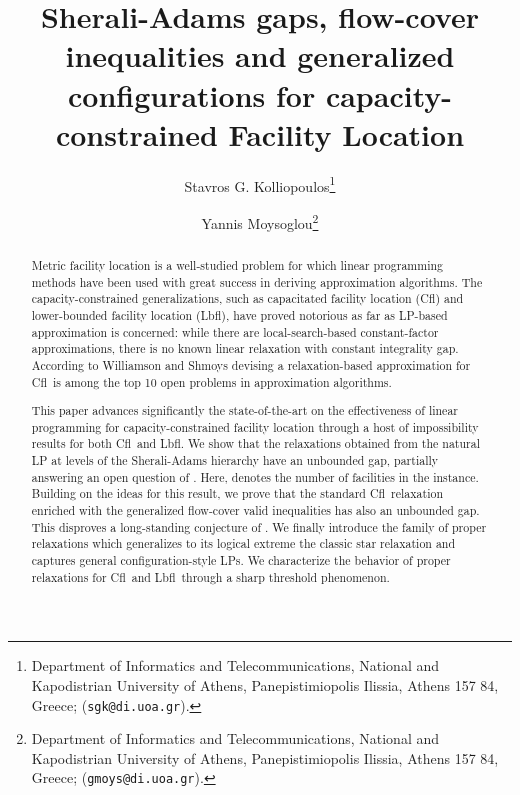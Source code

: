 \documentclass[11pt]{article}
\date{}
\newcommand{\lbfl}{{\sc Lbfl}}
\newcommand{\cfl}{{\sc Cfl}}
\begin{document}
\title{
Sherali-Adams gaps, flow-cover inequalities and generalized configurations for
 capacity-constrained Facility Location 
}

\author{Stavros G. Kolliopoulos\thanks{Department of Informatics and
Telecommunications, National and Kapodistrian 
University of Athens, Panepistimiopolis Ilissia, Athens
157 84, Greece; (\texttt{sgk@di.uoa.gr}).}   
\and Yannis Moysoglou\thanks{ 
Department of Informatics and
Telecommunications, National and Kapodistrian 
University of Athens, Panepistimiopolis Ilissia, Athens
157 84, Greece; (\texttt{gmoys@di.uoa.gr}). } }


\maketitle

\begin{abstract}
Metric facility  location is a  well-studied problem for  which linear
programming  methods have  been used  with great  success  in deriving
approximation  algorithms.  The capacity-constrained  generalizations,
such  as  capacitated  facility  location (\cfl\/)  and  lower-bounded
facility location  (\lbfl), have proved  notorious as far  as LP-based
approximation  is  concerned:   while  there  are  local-search-based
constant-factor  approximations, there  is no known  linear relaxation
with  constant  integrality gap.  According  to    Williamson and Shmoys 
devising a  relaxation-based approximation for \cfl\ is  among the top
10 open problems in approximation algorithms.

This paper  advances significantly the  state-of-the-art 
on  the effectiveness of
linear programming for capacity-constrained facility location
through  a host of impossibility 
results   
for  both \cfl\  and  \lbfl.   We show  that  the  relaxations
obtained   from  the  natural   LP  at     levels   of  the
Sherali-Adams  hierarchy  have an  unbounded  gap,  partially 
answering an  open
question of  \cite{LiS13, AnBS13}. Here,  denotes the  number of facilities
in the instance.  Building on the ideas for this result, we prove that
the standard \cfl\ relaxation enriched with the generalized flow-cover
valid inequalities  \cite{AardalPW95} has  also an unbounded  gap.  
This disproves a long-standing conjecture of \cite{LeviSS12}. 
We
finally introduce  the family of proper  relaxations which generalizes
to  its  logical extreme  the  classic  star  relaxation and  captures
general  configuration-style  LPs.  We  characterize  the behavior  of
proper  relaxations for  \cfl\ and  \lbfl\ through  a  sharp threshold
phenomenon.


\end{abstract}
\end{document}
